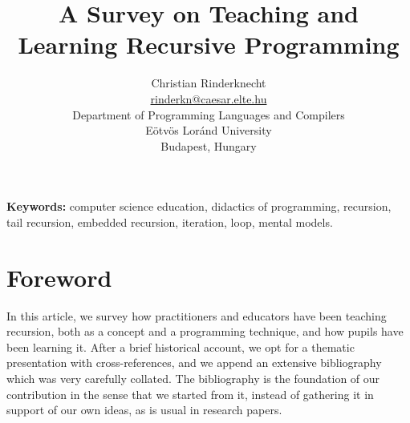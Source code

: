 \documentclass[11pt,a4paper]{article}
\title{A Survey on Teaching and Learning Recursive Programming}
\date{}
\author{Christian Rinderknecht\\
\small \url{rinderkn@caesar.elte.hu}\\
\small Department of Programming Languages and Compilers\\
\small E\"otv\"os Lor\'and University\\
\small Budapest, Hungary}
\begin{document}
\maketitle



\bigskip

\noindent\textbf{Keywords:} computer science education, didactics of
programming, recursion, tail recursion, embedded recursion, iteration,
loop, mental models.

\section*{Foreword}

In this article, we survey how practitioners and educators have been
teaching recursion, both as a concept and a programming technique, and
how pupils have been learning it. After a brief historical account, we
opt for a thematic presentation with cross\hyp{}references, and we
append an extensive bibliography which was very carefully
collated. The bibliography is the foundation of our contribution in
the sense that we started from it, instead of gathering it in support
of our own ideas, as is usual in research papers.
\end{document}
